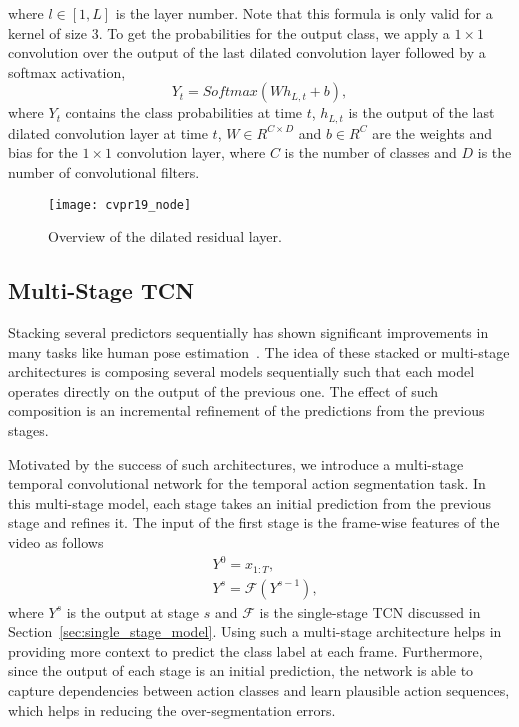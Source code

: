 \documentclass[10pt,twocolumn,letterpaper]{article}
\begin{document}
where $l \in \left[ 1, L\right] $ is the layer number. Note that this formula is only 
valid for a kernel of size 3. To get the probabilities for the output class, we apply a 
$1 \times 1$ convolution over the output of the last dilated convolution layer followed 
by a softmax activation, \ie
\begin{equation}
Y_t = Softmax(Wh_{L,t} + b), 
\end{equation}
where $Y_t$ contains the class probabilities at time $t$, $h_{L,t}$ is the output 
of the last dilated convolution layer at time $t$, $W \in R^{C \times D}$ and 
$b \in R^{C}$ are the weights and bias for the $1 \times 1$ convolution layer, 
where $C$ is the number of classes and $D$ is the number of convolutional filters.
   

\begin{figure}[tb]
\begin{center}
   \texttt{[image: cvpr19\_node]}
\end{center}
   \caption{Overview of the dilated residual layer.}
\label{fig:layer}
\end{figure}


\subsection{Multi-Stage TCN}
\label{sec:multi_stage_model}
Stacking several predictors sequentially has shown significant 
improvements in many tasks like human pose estimation~\cite{wei2016convolutional, 
newell2016stacked}. The idea of these stacked or multi-stage architectures 
is composing several models sequentially such that each model operates directly on 
the output of the previous one. The effect of such composition is 
an incremental refinement of the predictions from the previous stages. 

Motivated by the success of such architectures, we introduce a multi-stage 
temporal convolutional network for the temporal action segmentation
task. In this multi-stage model, each stage takes an initial prediction from 
the previous stage and refines it. The input of the first stage is the 
frame-wise features of the video as follows
\begin{align}
& Y^0 = x_{1:T}, \\
& Y^s = \mathcal{F}(Y^{s-1}), 
\end{align}
where $Y^s$ is the output at stage $s$ and $\mathcal{F}$ is the single-stage TCN 
discussed in Section~\ref{sec:single_stage_model}. Using such a multi-stage 
architecture helps in providing more context to predict the class label at each 
frame. Furthermore, since the output of each stage is an initial prediction, 
the network is able to capture dependencies between action classes and learn 
plausible action sequences, which helps in reducing the over-segmentation errors.
\end{document}
